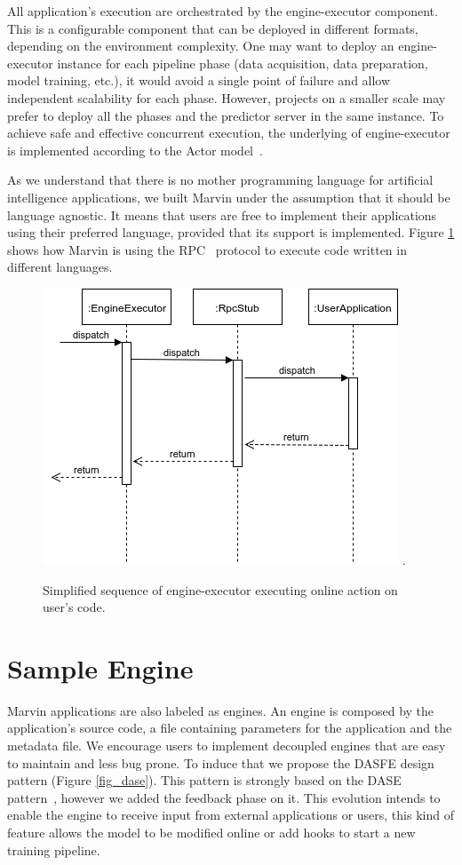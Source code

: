 \documentclass[twoside,11pt]{article}
\begin{document}
All application's execution are orchestrated by the engine-executor component. This is a configurable component that can be deployed in different formats, depending on the environment complexity. One may want to deploy an engine-executor instance for each pipeline phase (data acquisition, data preparation, model training, etc.), it would avoid a single point of failure and allow independent scalability for each phase. However, projects on a smaller scale may prefer to deploy all the phases and the predictor server in the same instance. To achieve safe and effective concurrent execution, the underlying of engine-executor is implemented according to the Actor model~\citep{hewitt1973session}.

As we understand that there is no mother programming language for artificial intelligence applications, we built Marvin under the assumption that it should be language agnostic. It means that users are free to implement their applications using their preferred language, provided that its support is implemented. Figure \ref{fig_rpc} shows how Marvin is using the RPC~\citep{srinivasan1995rpc} protocol to execute code written in different languages.

\begin{figure}[h]
\centering
\includegraphics[scale=0.5]{fig/marvin-rpc.png}
\DeclareGraphicsExtensions.
\caption{Simplified sequence of engine-executor executing online action on user's code.}
\label{fig_rpc}
\end{figure}

\section{Sample Engine}

Marvin applications are also labeled as engines. An engine is composed by the application's source code, a file containing parameters for the application and the metadata file. We encourage users to implement decoupled engines that are easy to maintain and less bug prone. To induce that we propose the DASFE design pattern (Figure \ref{fig_dase}). This pattern is strongly based on the DASE pattern~\citep{chan2013predictionio}, however we added the feedback phase on it. This evolution intends to enable the engine to receive input from external applications or users, this kind of feature allows the model to be modified online or add hooks to start a new training pipeline.
\end{document}
